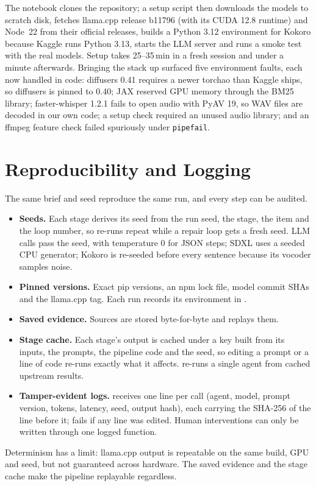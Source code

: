 \documentclass[twoside,11pt]{article}
\begin{document}
The notebook clones the repository; a setup script then downloads the models to scratch disk, fetches llama.cpp release b11796 (with its CUDA 12.8 runtime) and Node~22 from their official releases, builds a Python 3.12 environment for Kokoro because Kaggle runs Python 3.13, starts the LLM server and runs a smoke test with the real models. Setup takes 25--35\,min in a fresh session and under a minute afterwards. Bringing the stack up surfaced five environment faults, each now handled in code: diffusers 0.41 requires a newer torchao than Kaggle ships, so diffusers is pinned to 0.40; JAX reserved GPU memory through the BM25 library; faster-whisper 1.2.1 fails to open audio with PyAV 19, so WAV files are decoded in our own code; a setup check required an unused audio library; and an ffmpeg feature check failed spuriously under \texttt{pipefail}.

\section{Reproducibility and Logging}
\label{sec:repro}

The same brief and seed reproduce the same run, and every step can be audited.
\begin{itemize}
\item \textbf{Seeds.} Each stage derives its seed from the run seed, the stage, the item and the loop number, so re-runs repeat while a repair loop gets a fresh seed. LLM calls pass the seed, with temperature 0 for JSON steps; SDXL uses a seeded CPU generator; Kokoro is re-seeded before every sentence because its vocoder samples noise.
\item \textbf{Pinned versions.} Exact pip versions, an npm lock file, model commit SHAs and the llama.cpp tag. Each run records its environment in .
\item \textbf{Saved evidence.} Sources are stored byte-for-byte and  replays them.
\item \textbf{Stage cache.} Each stage's output is cached under a key built from its inputs, the prompts, the pipeline code and the seed, so editing a prompt or a line of code re-runs exactly what it affects.  re-runs a single agent from cached upstream results.
\item \textbf{Tamper-evident logs.}  receives one line per call (agent, model, prompt version, tokens, latency, seed, output hash), each carrying the SHA-256 of the line before it;  fails if any line was edited. Human interventions can only be written through one logged function.
\end{itemize}
Determinism has a limit: llama.cpp output is repeatable on the same build, GPU and seed, but not guaranteed across hardware. The saved evidence and the stage cache make the pipeline replayable regardless.
\end{document}
